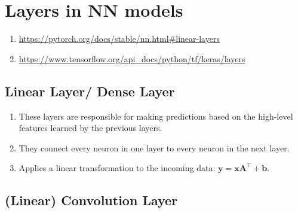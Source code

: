 \chapter{Layers in NN models}

\begin{enumerate}
    \item \url{https://pytorch.org/docs/stable/nn.html#linear-layers}
    \item \url{https://www.tensorflow.org/api_docs/python/tf/keras/layers}
\end{enumerate}


\section{Linear Layer/ Dense Layer \cite{pytorch-Linear,gfg-convolutional-neural-network-cnn-in-machine-learning}}\label{nn: Linear Layer/ Dense Layer}

\begin{enumerate}
    \item These layers are responsible for making predictions based on the high-level features learned by the previous layers. 
    
    \item They connect every neuron in one layer to every neuron in the next layer.
    
    \item Applies a linear transformation to the incoming data: $\mathbf{y=xA^\top+b}$.
\end{enumerate}




\section{(Linear) Convolution Layer \cite{gfg-convolutional-neural-network-cnn-in-machine-learning}}\label{nn: Convolution Layer}

